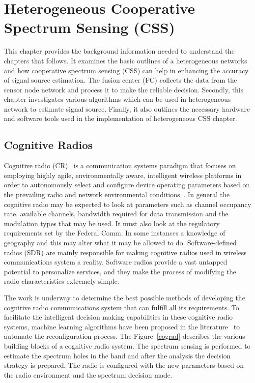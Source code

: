 \chapter{Heterogeneous Cooperative Spectrum Sensing (CSS)}
\label{chapter2}

This chapter provides the background information needed to understand the chapters that follows. It examines the basic outlines of a heterogeneous networks and how cooperative spectrum sensing (CSS) can help in enhancing the accuracy of signal source estimation. The fusion center (FC) collects the data from the sensor node network and process it to make the reliable decision. Secondly, this chapter investigates various algorithms which can be used in heterogeneous network to estimate signal source. Finally, it also outlines the necessary hardware and software tools used in the implementation of heterogeneous CSS chapter.

\section{Cognitive Radios}
Cognitive radio (CR)~\cite{cogjm} is a communication systems paradigm that focuses on employing highly agile, environmentally aware, intelligent wireless platforms in
order to autonomously select and configure device operating parameters based on the prevailing radio and network environmental conditions~\cite{bookhtn1}. In general the cognitive radio may be expected to look at parameters such as channel occupancy rate, available channels, bandwidth required for data transmission and the modulation types that may be used. It must also look at the regulatory requirements set by the Federal Comm. In some instances a knowledge of geography and this may alter what it may be allowed to do. Software-defined radios (SDR) are mainly responsible for making cognitive radios used in wireless communications system a reality. Software radios provide a vast untapped potential to personalize services, and they make the process of modifying the radio characteristics extremely simple. 

The work is underway to determine the best possible methods of developing the cognitive radio communications system that can fulfill all its requirements. To facilitate the intelligent decision making capabilities in these cognitive radio systems, machine learning algorithms have been proposed in the literature~\cite{barker2008mission,haykin2005cognitive,newman2007cognitive,newman2008population} to automate the reconfiguration process. The Figure~\ref{cograd} describes the various building blocks of a cognitive radio system. The spectrum sensing is performed to estimate the spectrum holes in the band and after the analysis the decision strategy is prepared. The radio is configured with the new parameters based on the radio environment and the spectrum decision made.  

